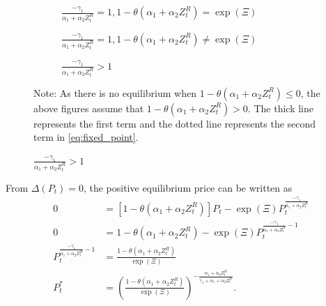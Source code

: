 \documentclass[11pt, a4paper]{article}
\theoremstyle{remark}
\begin{document}
\begin{figure}[!ht]
    \vspace{1em}
    \begin{subfigure}{0.45\textwidth}
         \caption{$\frac{-\gamma_1}{\alpha_1 + \alpha_2 Z^{R}_{t}} = 1, 1-\theta(\alpha_1+\alpha_2 Z_t^R) = \exp(\Xi) $}
         \label{fig:fixed_coinside}
    \end{subfigure}
    \hfill
    \begin{subfigure}{0.45\textwidth}
         \caption{$\frac{-\gamma_1}{\alpha_1 + \alpha_2 Z^{R}_{t}} = 1, 1-\theta(\alpha_1+\alpha_2 Z_t^R) \ne \exp(\Xi) $}
         \label{fig:fixed_parallel}
    \end{subfigure}
    \vspace{1em}
    \begin{subfigure}{0.4\textwidth}
         \caption{$\frac{-\gamma_1}{\alpha_1 + \alpha_2 Z^{R}_{t}}> 1$}
         \label{fig:fixed_convex}
    \end{subfigure}
    
    \footnotesize
    Note: As there is no equilibrium when $1- \theta(\alpha_1 + \alpha_2 Z^{R}_{t}) \le 0$, the above figures assume that $1- \theta(\alpha_1 + \alpha_2 Z^{R}_{t}) > 0$.
    The thick line represents the first term and the dotted line represents the second term in \eqref{eq:fixed_point}.
\end{figure}


From $\Delta (P_t) = 0$, the positive equilibrium price can be written as 
\begin{align}
    0 & = [1-\theta(\alpha_1 + \alpha_2 Z^{R}_{t})]P_t - \exp(\Xi) P_t^{\frac{-\gamma_1}{\alpha_1 + \alpha_2 Z^{R}_{t}}}\nonumber \\ 
    0 & = 1-\theta(\alpha_1 + \alpha_2 Z^{R}_{t}) - \exp(\Xi)P_t^{\frac{-\gamma_1}{\alpha_1 + \alpha_2 Z^{R}_{t}}- 1} \nonumber\\ 
    P_t^{\frac{-\gamma_1}{\alpha_1 + \alpha_2 Z^{R}_{t}}- 1} & = \frac{1-\theta(\alpha_1 + \alpha_2 Z^{R}_{t})}{ \exp(\Xi)}\nonumber\\ 
    P_{t}^* &= \left(\frac{1-\theta(\alpha_1 + \alpha_2 Z^{R}_{t})}{\exp(\Xi)}\right)^{-\frac{\alpha_1 + \alpha_2 Z^{R}_{t}}{\gamma_1 +\alpha_1 + \alpha_2 Z^{R}_{t}}}.
\end{align} 
\end{document}

